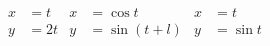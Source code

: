 \documentclass[nofonts]{ctexart}
\begin{document}
\begin{align}
	x &= t	&x &= \cos t	&x &= t		\\
	y &= 2t	&y &= \sin (t+l)&y &= \sin t
\end{align}
\end{document}
